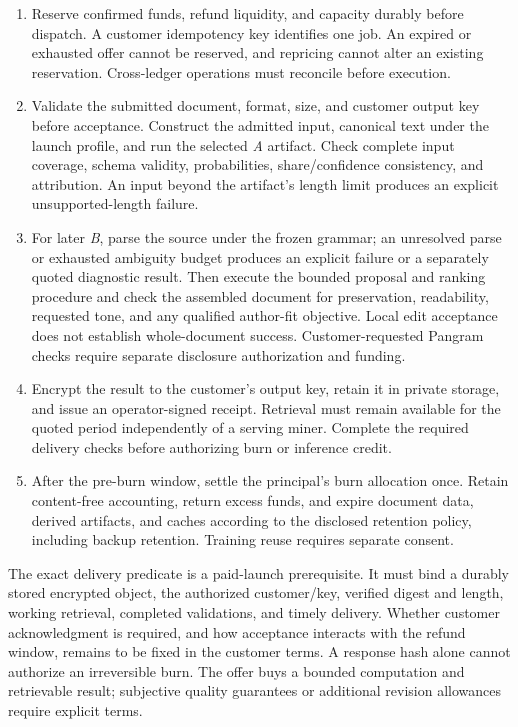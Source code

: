 \begin{enumerate}
\tightlist
\item Reserve confirmed funds, refund liquidity, and capacity durably before
dispatch. A customer idempotency key identifies one job. An expired or
exhausted offer cannot be reserved, and repricing cannot alter an existing
reservation. Cross-ledger operations must reconcile before execution.
\item Validate the submitted document, format, size, and customer output key
before acceptance. Construct the admitted input, canonical text under the
launch profile, and run the selected \textit{A} artifact. Check complete input
coverage, schema validity, probabilities, share/confidence consistency, and
attribution. An input beyond the artifact's length limit produces an explicit
unsupported-length failure.
\item For later \textit{B}, parse the source under the frozen grammar; an
unresolved parse or exhausted ambiguity budget produces an explicit failure or
a separately quoted diagnostic result. Then execute the bounded proposal and
ranking procedure and check the assembled document for preservation, readability, requested
tone, and any qualified author-fit objective. Local edit acceptance does not
establish whole-document success. Customer-requested Pangram checks require
separate disclosure authorization and funding.
\item Encrypt the result to the customer's output key, retain it in private
storage, and issue an operator-signed receipt. Retrieval must remain available
for the quoted period independently of a serving miner. Complete the required
delivery checks before authorizing burn or inference credit.
\item After the pre-burn window, settle the principal's burn allocation once.
Retain content-free accounting, return excess funds, and expire document data,
derived artifacts, and caches according to the disclosed retention policy,
including backup retention. Training reuse requires separate consent.
\end{enumerate}

The exact delivery predicate is a paid-launch prerequisite. It must bind a
durably stored encrypted object, the authorized customer/key, verified digest
and length, working retrieval, completed validations, and timely delivery.
Whether customer acknowledgment is required, and how acceptance interacts
with the refund window, remains to be fixed in the customer terms. A response
hash alone cannot authorize an irreversible burn. The offer buys a bounded
computation and retrievable result; subjective quality guarantees or additional
revision allowances require explicit terms.

